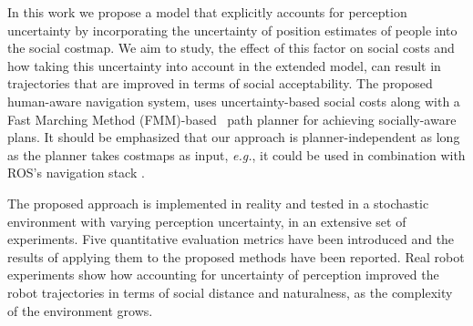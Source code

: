In this work we propose a model that explicitly accounts for perception uncertainty by incorporating the uncertainty of position estimates of people into the social costmap. We aim to study, the effect of this factor on social costs and how taking this uncertainty into account in the extended model, can result in trajectories that are improved in terms of social acceptability. The proposed human-aware navigation system, uses uncertainty-based social costs along with a Fast Marching Method (FMM)-based~\cite{sethian1999fast} path planner for achieving socially-aware plans. It should be emphasized that our approach is planner-independent as long as the planner takes costmaps as input, \textit{e.g.}, it could be used in combination with ROS's navigation stack \cite{lu2014iros}. 


The proposed approach is implemented in reality and tested in a stochastic environment with varying perception uncertainty, in an extensive set of experiments. Five quantitative evaluation metrics have been introduced and the results of applying them to the proposed methods have been reported. Real robot experiments show how accounting for uncertainty of perception improved the robot trajectories in terms of social distance and naturalness, as the complexity of the environment grows.














